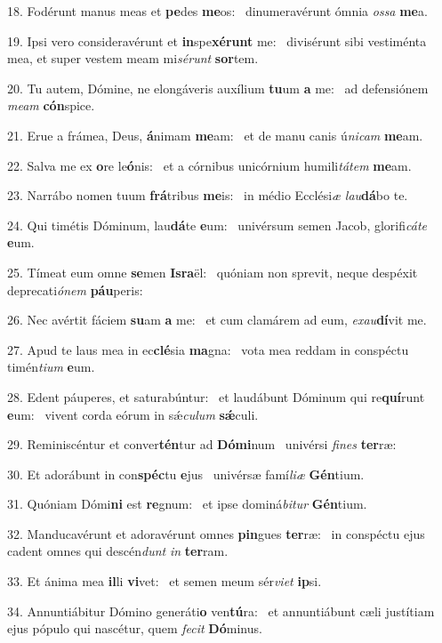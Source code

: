 18. Fodérunt manus meas et \textbf{pe}des \textbf{me}os: \ast\  dinumeravérunt ómnia \textit{os}\textit{sa} \textbf{me}a.\

19. Ipsi vero consideravérunt et \textbf{in}spe\textbf{xé}\textbf{runt} me: \ast\  divisérunt sibi vestiménta mea, et super vestem meam mi\textit{sé}\textit{runt} \textbf{sor}tem.\

20. Tu autem, Dómine, ne elongáveris auxílium \textbf{tu}um \textbf{a} me: \ast\  ad defensiónem \textit{me}\textit{am} \textbf{cón}spice.\

21. Erue a frámea, Deus, \textbf{á}nimam \textbf{me}am: \ast\  et de manu canis ú\textit{ni}\textit{cam} \textbf{me}am.\

22. Salva me ex \textbf{o}re le\textbf{ó}nis: \ast\  et a córnibus unicórnium humili\textit{tá}\textit{tem} \textbf{me}am.\

23. Narrábo nomen tuum \textbf{frá}tribus \textbf{me}is: \ast\  in médio Ecclési\textit{æ} \textit{lau}\textbf{dá}bo te.\

24. Qui timétis Dóminum, lau\textbf{dá}te \textbf{e}um: \ast\  univérsum semen Jacob, glorifi\textit{cá}\textit{te} \textbf{e}um.\

25. Tímeat eum omne \textbf{se}men \textbf{Is}\textbf{ra}ël: \ast\  quóniam non sprevit, neque despéxit deprecati\textit{ó}\textit{nem} \textbf{páu}peris:\

26. Nec avértit fáciem \textbf{su}am \textbf{a} me: \ast\  et cum clamárem ad eum, \textit{ex}\textit{au}\textbf{dí}vit me.\

27. Apud te laus mea in ec\textbf{clé}sia \textbf{ma}gna: \ast\  vota mea reddam in conspéctu timén\textit{ti}\textit{um} \textbf{e}um.\

28. Edent páuperes, et saturabúntur: \dag\  et laudábunt Dóminum qui re\textbf{quí}runt \textbf{e}um: \ast\  vivent corda eórum in sǽ\textit{cu}\textit{lum} \textbf{sǽ}culi.\

29. Reminiscéntur et conver\textbf{tén}tur ad \textbf{Dó}\textbf{mi}num \ast\  univérsi \textit{fi}\textit{nes} \textbf{ter}ræ:\

30. Et adorábunt in con\textbf{spéc}tu \textbf{e}jus \ast\  univérsæ famí\textit{li}\textit{æ} \textbf{Gén}tium.\

31. Quóniam Dómi\textbf{ni} est \textbf{re}gnum: \ast\  et ipse dominá\textit{bi}\textit{tur} \textbf{Gén}tium.\

32. Manducavérunt et adoravérunt omnes \textbf{pin}gues \textbf{ter}ræ: \ast\  in conspéctu ejus cadent omnes qui descén\textit{dunt} \textit{in} \textbf{ter}ram.\

33. Et ánima mea \textbf{il}li \textbf{vi}vet: \ast\  et semen meum sér\textit{vi}\textit{et} \textbf{ip}si.\

34. Annuntiábitur Dómino generáti\textbf{o} ven\textbf{tú}ra: \ast\  et annuntiábunt cæli justítiam ejus pópulo qui nascétur, quem \textit{fe}\textit{cit} \textbf{Dó}minus.\

